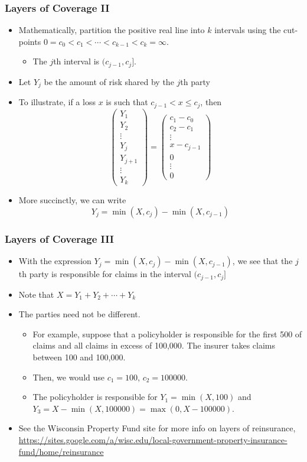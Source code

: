 \documentclass{beamer}
\begin{document}
\begin{frame}%
\frametitle{Layers of Coverage II}
\begin{itemize}
\item Mathematically, partition the positive real line into $k$ intervals using the cut-points $0 = c_0 < c_1 < \cdots < c_{k-1} < c_k = \infty$.
\begin{itemize}\item The $j$th interval is $(c_{j-1}, c_j]$.\end{itemize}
\item Let $Y_j$ be the amount of risk shared by the $j$th party
\item To illustrate, if a loss $x$ is such that $c_{j-1} <x \le c_j$, then
$$
\left(\begin{array}{c}
Y_1\\ Y_2 \\ \vdots \\ Y_j \\Y_{j+1} \\ \vdots \\Y_k
\end{array}\right)
=\left(\begin{array}{c}
c_1-c_0 \\ c_2-c_1  \\ \vdots \\ x-c_{j-1}  \\ 0 \\ \vdots \\0
\end{array}\right)
$$
\item More succinctly, we can write
$$Y_j = \min(X,c_j) - \min(X,c_{j-1}) $$
\end{itemize}
\end{frame}

\begin{frame}%
\frametitle{Layers of Coverage III}
\begin{itemize}
\item With the expression $Y_j = \min(X,c_j) - \min(X,c_{j-1}) $, we see that the $j$th party is responsible for claims in the interval $(c_{j-1}, c_j]$
\item Note that $X = Y_1 + Y_2 + \cdots + Y_k$
\item The parties need not be different.
\begin{itemize}
\item For example, suppose that a policyholder is responsible for the first 500 of claims and all claims in excess of 100,000. The insurer takes claims between 100 and 100,000.
\item Then, we would use $c_1 = 100$, $c_2 =100000$.
\item The policyholder is responsible for $Y_1 =\min(X,100)$ and $Y_3 = X - \min(X,100000) = \max(0, X-100000)$.
\end{itemize}
\item See the Wisconsin Property Fund site for more info on layers of reinsurance,
\url{https://sites.google.com/a/wisc.edu/local-government-property-insurance-fund/home/reinsurance}
\end{itemize}
\end{frame}
\end{document}

